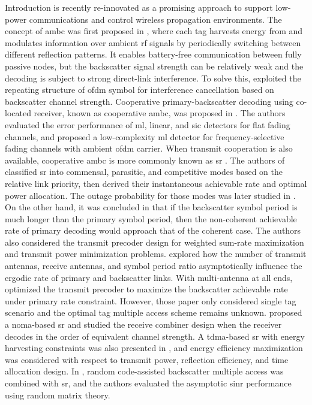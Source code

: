 \documentclass[journal]{IEEEtran}
\begin{document}
\begin{section}{Introduction}
	 is recently re-innovated as a promising approach to support low-power communications and control wireless propagation environments.
	The concept of \gls{ambc} was first proposed in \cite{Liu2013b}, where each tag harvests energy from and modulates information over ambient \gls{rf} signals by periodically switching between different reflection patterns.
	It enables battery-free communication between fully passive nodes, but the backscatter signal strength can be relatively weak and the decoding is subject to strong direct-link interference.
	To solve this, \cite{Yang2018d} exploited the repeating structure of \gls{ofdm} symbol for interference cancellation based on backscatter channel strength.
	Cooperative primary-backscatter decoding using co-located receiver, known as cooperative \gls{ambc}, was proposed in \cite{Yang2018}.
	The authors evaluated the error performance of \gls{ml}, linear, and \gls{sic} detectors for flat fading channels, and proposed a low-complexity \gls{ml} detector for frequency-selective fading channels with ambient \gls{ofdm} carrier.
	When transmit cooperation is also available, cooperative \gls{ambc} is more commonly known as \gls{sr} \cite{Liang2020}.
	The authors of \cite{Guo2019b} classified \gls{sr} into commensal, parasitic, and competitive modes based on the relative link priority, then derived their instantaneous achievable rate and optimal power allocation.
	The outage probability for those modes was later studied in \cite{Ding2020}.
	On the other hand, it was concluded in \cite{Long2020a} that if the backscatter symbol period is much longer than the primary symbol period, then the non-coherent achievable rate of primary decoding would approach that of the coherent case.
	The authors also considered the transmit precoder design for weighted sum-rate maximization and transmit power minimization problems.
	\cite{Zhou2019a} explored how the number of transmit antennas, receive antennas, and symbol period ratio asymptotically influence the ergodic rate of primary and backscatter links.
	With multi-antenna at all ends, \cite{Wu2021a} optimized the transmit precoder to maximize the backscatter achievable rate under primary rate constraint.
	However, those paper only considered single tag scenario and the optimal tag multiple access scheme remains unknown.
	\cite{Xu2021a} proposed a \gls{noma}-based \gls{sr} and studied the receive combiner design when the receiver decodes in the order of equivalent channel strength.
	A \gls{tdma}-based \gls{sr} with energy harvesting constraints was also presented in \cite{Yang2021a}, and energy efficiency maximization was considered with respect to transmit power, reflection efficiency, and time allocation design.
	In \cite{Han2021}, random code-assisted backscatter multiple access was combined with \gls{sr}, and the authors evaluated the asymptotic \gls{sinr} performance using random matrix theory.


\end{section}
\end{document}
